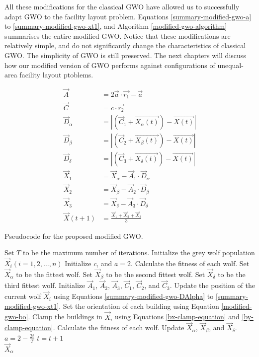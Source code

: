 All these modifications for the classical GWO have allowed us to successfully adapt GWO to the facility layout problem. Equations \ref{summary-modified-gwo-a} to \ref{summary-modified-gwo-xt1}, and Algorithm \ref{modified-gwo-algorithm} summarises the entire modified GWO. Notice that these modifications are relatively simple, and do not significantly change the characteristics of classical GWO. The simplicity of GWO is still preserved. The next chapters will discuss how our modified version of GWO performs against configurations of unequal-area facility layout ptoblems.

\begin{align}
	\vec{A} &= 2\vec{a} \cdot \vec{r_{1}} - \vec{a} \label{summary-modified-gwo-a} \\
	\vec{C} &= c \cdot \vec{r_{2}} \\
	\vec{D}_{\alpha} &= \left | \left ( \vec{C}_{1} + \vec{X_{\alpha}(t)} \right ) - \vec{X(t)} \right | \label{summary-modified-gwo-DAlpha} \\
	\vec{D}_{\beta} &= \left | \left ( \vec{C}_{2} + \vec{X_{\beta}(t)} \right ) - \vec{X(t)} \right | \\
	\vec{D}_{\delta} &= \left | \left ( \vec{C}_{3} + \vec{X_{\delta}(t)} \right ) - \vec{X(t)} \right | \\
	\vec{X}_{1} &= \vec{X}_{\alpha} - \vec{A}_{1} \cdot \vec{D}_{\alpha} \\
	\vec{X}_{2} &= \vec{X}_{\beta} - \vec{A}_{2} \cdot \vec{D}_{\beta} \\
	\vec{X}_{3} &= \vec{X}_{\delta} - \vec{A}_{3} \cdot \vec{D}_{\delta} \\
	\vec{X}(t + 1) &= \frac{\vec{X}_{1} + \vec{X}_{2} + \vec{X}_{3}}{3} \label{summary-modified-gwo-xt1}
\end{align}

\begin{algorithm}[h!]
\caption{Pseudocode for the proposed modified GWO.}
\label{modified-gwo-algorithm}
\begin{algorithmic}[1]
\State Set $T$ to be the maximum number of iterations.
\State Initialize the grey wolf population $\vec{X}_{i} (i = 1, 2, \ldots, n)$
\State Initialize $c$, and $a = 2$.
\State Calculate the fitness of each wolf.
\State Set $\vec{X}_{\alpha}$ to be the fittest wolf.
\State Set $\vec{X}_{\beta}$ to be the second fittest wolf.
\State Set $\vec{X}_{\delta}$ to be the third fittest wolf.
		\State Initialize $\vec{A}_{1}$, $\vec{A}_{2}$, $\vec{A}_{3}$, $\vec{C}_{1}$, $\vec{C}_{2}$, and $\vec{C}_{3}$.
		\State Update the position of the current wolf $\vec{X}_{i}$ using Equations \ref{summary-modified-gwo-DAlpha} to \ref{summary-modified-gwo-xt1}.
		\State Set the orientation of each building using Equation \ref{modified-gwo-bo}.
		\State Clamp the buildings in $\vec{X}_{i}$ using Equations \ref{bx-clamp-equation} and \ref{by-clamp-equation}.
	\EndFor
	\State Calculate the fitness of each wolf.
	\State Update $\vec{X}_{\alpha}$, $\vec{X}_{\beta}$, and $\vec{X}_{\delta}$.
	\State $a = 2 - \frac{2t}{T}$
	\State $t = t + 1$
\EndWhile \\
\Return $\vec{X}_{\alpha}$
\end{algorithmic}
\end{algorithm}

